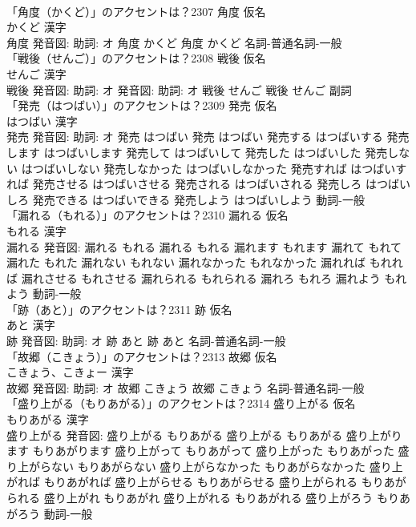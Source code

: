 \documentclass[8pt]{extreport}
\begin{document}
\begin{CJK}{UTF8}{min}
\\	「角度（かくど）」のアクセントは？2307	角度 仮名　
\\	かくど 漢字　
\\	角度 発音図: 助詞: オ	角度 かくど		角度 かくど				名詞-普通名詞-一般 
\\	「戦後（せんご）」のアクセントは？2308	戦後 仮名　
\\	せんご 漢字　
\\	戦後 発音図: 助詞: オ 発音図: 助詞: オ	戦後 せんご		戦後 せんご				副詞 
\\	「発売（はつばい）」のアクセントは？2309	発売 仮名　
\\	はつばい 漢字　
\\	発売 発音図: 助詞: オ	発売 はつばい		発売 はつばい 発売する はつばいする 発売します はつばいします 発売して はつばいして 発売した はつばいした 発売しない はつばいしない 発売しなかった はつばいしなかった 発売すれば はつばいすれば 発売させる はつばいさせる 発売される はつばいされる 発売しろ はつばいしろ 発売できる はつばいできる 発売しよう はつばいしよう				動詞-一般 
\\	「漏れる（もれる）」のアクセントは？2310	漏れる 仮名　
\\	もれる 漢字　
\\	漏れる 発音図:	漏れる もれる		漏れる もれる 漏れます もれます 漏れて もれて 漏れた もれた 漏れない もれない 漏れなかった もれなかった 漏れれば もれれば 漏れさせる もれさせる 漏れられる もれられる 漏れろ もれろ 漏れよう もれよう				動詞-一般 
\\	「跡（あと）」のアクセントは？2311	跡 仮名　
\\	あと 漢字　
\\	跡 発音図: 助詞: オ	跡 あと		跡 あと				名詞-普通名詞-一般 
\\	「故郷（こきょう）」のアクセントは？2313	故郷 仮名　
\\	こきょう、こきょー 漢字　
\\	故郷 発音図: 助詞: オ	故郷 こきょう		故郷 こきょう				名詞-普通名詞-一般 
\\	「盛り上がる（もりあがる）」のアクセントは？2314	盛り上がる 仮名　
\\	もりあがる 漢字　
\\	盛り上がる 発音図:	盛り上がる もりあがる		盛り上がる もりあがる 盛り上がります もりあがります 盛り上がって もりあがって 盛り上がった もりあがった 盛り上がらない もりあがらない 盛り上がらなかった もりあがらなかった 盛り上がれば もりあがれば 盛り上がらせる もりあがらせる 盛り上がられる もりあがられる 盛り上がれ もりあがれ 盛り上がれる もりあがれる 盛り上がろう もりあがろう				動詞-一般 

\end{CJK}
\end{document}
